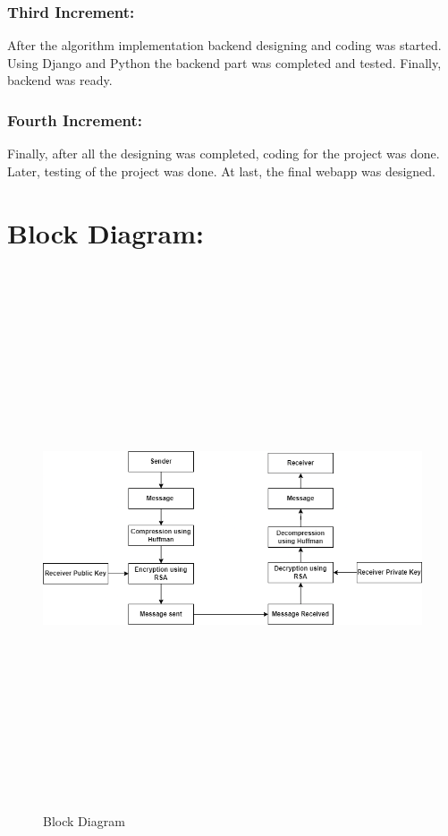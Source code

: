 \subsubsection{Third Increment:}
After the algorithm implementation backend designing and coding
was started. Using Django and Python the backend part
was completed and tested. Finally, backend was ready.

\subsubsection{Fourth Increment:}
Finally, after all the designing was completed, coding for the project was done. Later,
testing of the project was done.
At last, the final webapp was designed.
\pagebreak

\section{Block Diagram:}
\begin{figure}[H]
	\centering
	\includegraphics[width=170mm, height=160mm]{images/Block Diagram.png}
	\caption{Block Diagram} %
	\label{figblockdiagram} %
\end{figure}

